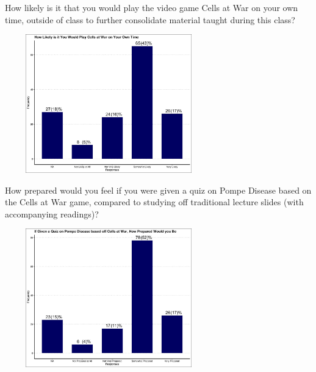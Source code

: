 \documentclass{beamer}
\begin{document}
	\begin{frame}{How likely is it that you would play the video game Cells at War on your own time, outside of class to further consolidate material taught during this class? }
		
		\begin{center}
			\includegraphics[width=9cm, height=6cm]{figures/how_likely_you_would_play_cellsatwar.jpg}
		\end{center}
		
	\end{frame}

	\begin{frame}{How prepared would you feel if you were given a quiz on Pompe Disease based on the Cells at War game, compared to studying off traditional lecture slides (with accompanying readings)? }
		
		\begin{center}
			\includegraphics[width=9cm, height=6cm]{figures/how_prepared_if_tested_on_pompe_based_off_cellsatwar.jpg}
		\end{center}
		
	\end{frame}
	
\end{document}
